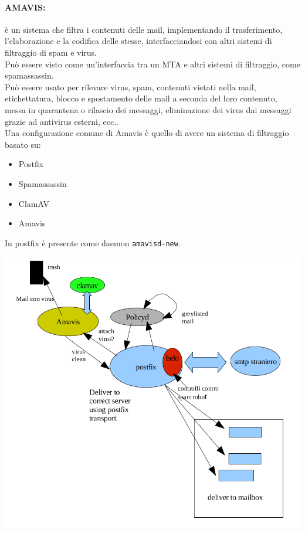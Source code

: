 \documentclass[a4paper]{report}
\begin{document}
\paragraph{AMAVIS:} è un sistema che filtra i contenuti delle mail, implementando il trasferimento, l'elaborazione e la codifica delle stesse, interfacciandosi con altri sistemi di filtraggio di spam e virus.\\
Può essere visto come un'interfaccia tra un MTA e altri sistemi di filtraggio, come spamassassin.\\
Può essere usato per rilevare virus, spam, contenuti vietati nella mail, etichettatura, blocco e spostamento delle mail a seconda del loro contenuto, messa in quarantena o rilascio dei messaggi, eliminazione dei virus dai messaggi grazie ad antivirus esterni, ecc..\\
Una configurazione comune di Amavis è quello di avere un sistema di filtraggio basato su:
\begin{itemize}
\item Postfix
\item Spamassassin
\item ClamAV
\item Amavis
\end{itemize}
In postfix è presente come daemon \texttt{amavisd-new}.
\begin{center}
\includegraphics[scale=0.5]{esempioamavis.png}\\
\end{center}
\end{document}
